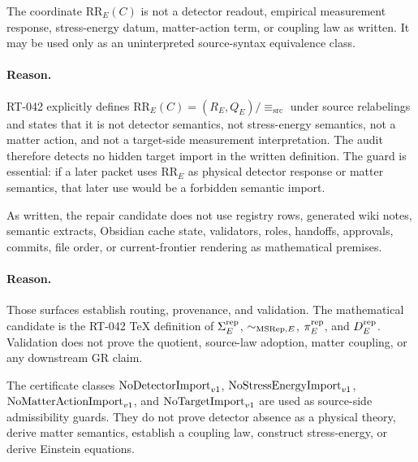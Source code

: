 \begin{proposition}
The coordinate \(\mathrm{RR}_E(C)\) is not a detector readout, empirical
measurement response, stress-energy datum, matter-action term, or coupling
law as written. It may be used only as an uninterpreted source-syntax
equivalence class.
\end{proposition}

\paragraph{Reason.}
RT-042 explicitly defines \(\mathrm{RR}_E(C)=(R_E,Q_E)/{\equiv_{\mathrm{src}}}\)
under source relabelings and states that it is not detector semantics, not
stress-energy semantics, not a matter action, and not a target-side
measurement interpretation. The audit therefore detects no hidden target
import in the written definition. The guard is essential: if a later packet
uses \(\mathrm{RR}_E\) as physical detector response or matter semantics, that
later use would be a forbidden semantic import.

\begin{proposition}
As written, the repair candidate does not use registry rows, generated wiki
notes, semantic extracts, Obsidian cache state, validators, roles, handoffs,
approvals, commits, file order, or current-frontier rendering as mathematical
premises.
\end{proposition}

\paragraph{Reason.}
Those surfaces establish routing, provenance, and validation. The mathematical
candidate is the RT-042 TeX definition of \(\Sigma^{\mathrm{rep}}_E\), \(\sim_{\mathrm{MSRep},E}\),
\(\pi^{\mathrm{rep}}_E\), and \(D^{\mathrm{rep}}_E\). Validation does not prove the quotient,
source-law adoption, matter coupling, or any downstream GR claim.

\begin{proposition}
The certificate classes \(\mathrm{NoDetectorImport}_{v1}\), \(\mathrm{NoStressEnergyImport}_{v1}\), \(\mathrm{NoMatterActionImport}_{v1}\), and
\(\mathrm{NoTargetImport}_{v1}\) are used as source-side admissibility guards. They do not prove
detector absence as a physical theory, derive matter semantics, establish a
coupling law, construct stress-energy, or derive Einstein equations.
\end{proposition}

